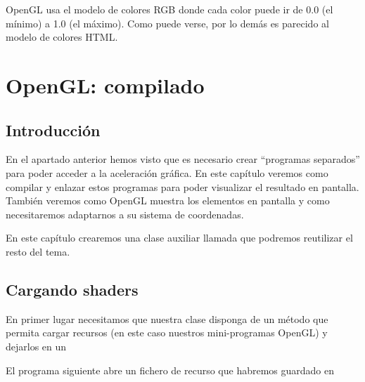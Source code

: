 \documentclass[a4paper,12pt,spanish]{sphinxmanual}
\begin{document}
OpenGL usa el modelo de colores RGB donde cada color puede ir de 0.0 (el mínimo) a 1.0 (el máximo). Como puede verse, por lo demás es parecido al modelo de colores HTML.


\chapter{OpenGL: compilado}
\label{cap3opengl:opengl-compilado}\label{cap3opengl::doc}

\section{Introducción}
\label{cap3opengl:introduccion}
En el apartado anterior hemos visto que es necesario crear ``programas separados'' para poder acceder a la aceleración gráfica. En este capítulo veremos como compilar y enlazar estos programas para poder visualizar el resultado en pantalla. También veremos como OpenGL muestra los elementos en pantalla y como necesitaremos adaptarnos a su sistema de coordenadas.

En este capítulo crearemos una clase auxiliar llamada  que podremos reutilizar el resto del tema.


\section{Cargando shaders}
\label{cap3opengl:cargando-shaders}
En primer lugar necesitamos que nuestra clase  disponga de un método que permita cargar recursos (en este caso nuestros mini-programas OpenGL) y dejarlos en un 

El programa siguiente abre un fichero de recurso que habremos guardado en 
\end{document}
